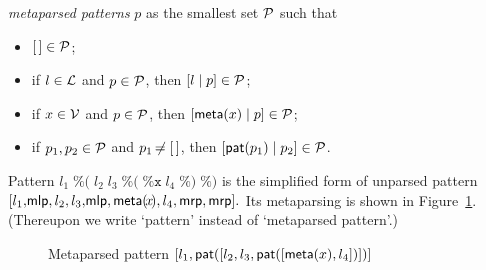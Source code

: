 \emph{meta\-parsed patterns} \(p\) as the smallest set \({\cal P}\)
such that
\begin{itemize}

  \item \(\el \in {\cal P}\);

  \item if \(l \in {\cal L}\) and \(p \in {\cal P}\), then
    \(\cons{l}{p} \in {\cal P}\);

  \item if \(x \in {\cal V}\) and \(p \in {\cal P}\), then
    \(\cons{\meta{x}}{p} \in {\cal P}\);

  \item if \(p_1, p_2 \in {\cal P}\) and \(p_1 \not\nobreak\mkern -2mu = [\,]\), then
    \(\cons{\pat{p_1}}{p_2} \in {\cal P}\).

\end{itemize}

Pattern \(l_1 \; \texttt{\%(} \; l_2 \; l_3 \; \texttt{\%(} \;
\texttt{\%x} \; l_4 \; \texttt{\%)} \; \texttt{\%)}\) is the
simplified form of unparsed pattern \([l_1, \!\textsf{mlp}, l_2, l_3, \!\textsf{mlp},
  \textsf{meta}(\!x\!), l_4, \textsf{mrp}, \textsf{mrp}].\) Its meta\-parsing is shown in
Figure~\ref{es1_pattern_tree}. (Thereupon we write `pattern' instead
of `meta\-parsed pattern'.)
\begin{figure}[h]
\caption{Metaparsed pattern \([l_1,
  \textsf{pat}([l_2, l_3, \textsf{pat}([\textsf{meta}(x), l_4])])]\)\label{es1_pattern_tree}}
\end{figure}

